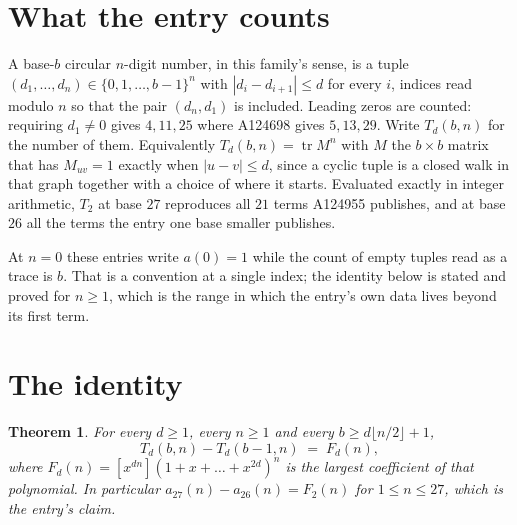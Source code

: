 \documentclass[11pt,a4paper]{article}
\theoremstyle{plain}
\newtheorem{theorem}{Theorem}
\theoremstyle{definition}
\begin{document}
\section{What the entry counts}

A base-$b$ circular $n$-digit number, in this family's sense, is a tuple
$(d_1,\dots,d_n)\in\{0,1,\dots,b-1\}^{n}$ with $|d_i-d_{i+1}|\le d$ for every $i$, indices
read modulo $n$ so that the pair $(d_n,d_1)$ is included. Leading zeros are counted: requiring
$d_1\ne0$ gives $4,11,25$ where A124698 gives $5,13,29$. Write $T_d(b,n)$ for the number of
them. Equivalently $T_d(b,n)=\operatorname{tr}M^{n}$ with $M$ the $b\times b$ matrix that has
$M_{uv}=1$ exactly when $|u-v|\le d$, since a cyclic tuple is a closed walk in that graph
together with a choice of where it starts. Evaluated exactly in integer arithmetic, $T_{2}$
at base $27$ reproduces all $21$ terms A124955 publishes, and at base $26$ all the
terms the entry one base smaller publishes.

At $n=0$ these entries write $a(0)=1$ while the count of empty tuples read as a trace is $b$.
That is a convention at a single index; the identity below is stated and proved for $n\ge1$,
which is the range in which the entry's own data lives beyond its first term.

\section{The identity}

\begin{theorem}
For every $d\ge1$, every $n\ge1$ and every $b\ge d\lfloor n/2\rfloor+1$,
\[
T_d(b,n)-T_d(b-1,n)\;=\;F_d(n),
\]
where $F_d(n)=[x^{dn}](1+x+\dots+x^{2d})^{n}$ is the largest coefficient of that
polynomial. In particular $a_{27}(n)-a_{26}(n)=F_{2}(n)$ for $1\le n\le27$, which
is the entry's claim.
\end{theorem}
\end{document}
